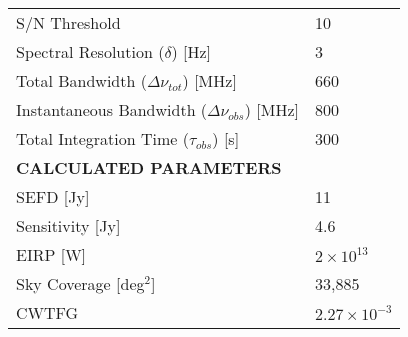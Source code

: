 \documentclass{article}
\begin{document}
\begin{table}[h]
\begin{tabular}{l|l}
\rowcolor[HTML]{EFEFEF}
S/N Threshold                                                                           & 10                                                     \\
Spectral Resolution ($\delta$) {[}Hz{]}                                                 & 3                                                      \\
\rowcolor[HTML]{EFEFEF}
Total Bandwidth ($ \Delta \nu_{tot}$) {[}MHz{]}                                         & 660                                                    \\
Instantaneous Bandwidth ($\Delta \nu_{obs}$) {[}MHz{]} & 800                                                    \\
\rowcolor[HTML]{EFEFEF}
Total Integration Time ($\tau_{obs}$) {[}s{]}                                           & 300                                                    \\ \hline
\textbf{CALCULATED PARAMETERS}                                                          &                                                        \\
\rowcolor[HTML]{EFEFEF}
SEFD {[}Jy{]}                                                                           & 11                                                     \\
Sensitivity {[}Jy{]}                                                                    & 4.6                                                    \\
\rowcolor[HTML]{EFEFEF}
EIRP {[}W{]}                                                                            & $2 \times 10 ^ {13}$                                   \\
\rowcolor[HTML]{FFFFFF}
Sky Coverage {[}deg$^2${]}                                                              & 33,885                                                 \\
\rowcolor[HTML]{EFEFEF}
CWTFG                                                                                   & $2.27 \times 10^{-3}$
\end{tabular}
\end{table}
\end{document}
